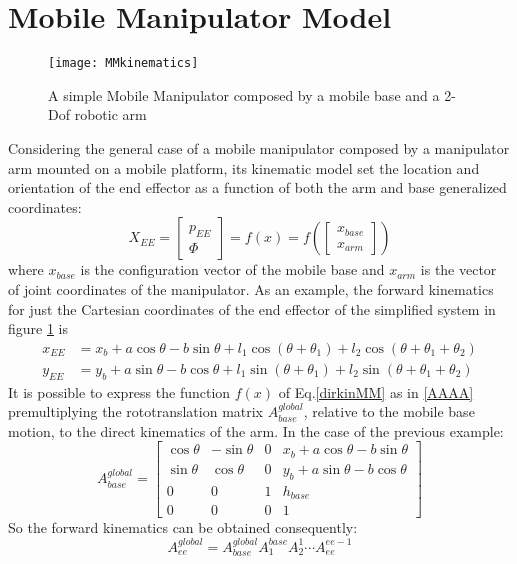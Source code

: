 \section{Mobile Manipulator Model}
\begin{figure}
\centering
\texttt{[image: MMkinematics]}
\caption{A simple Mobile Manipulator composed by a mobile base and a 2-Dof robotic arm}
\label{fig:MMkinematics}
\end{figure}
Considering the general case of a mobile manipulator composed by a manipulator arm mounted on a mobile platform, its kinematic model set the location and orientation of the end effector as a function of both the arm and base generalized coordinates:
\begin{equation}\label{dirkinMM}
	X_{EE}=\left[\begin{matrix}p_{EE}\\\Phi\end{matrix}\right]=f(x)=f\left(\left[\begin{matrix}x_{base}\\x_{arm} \end{matrix}\right]\right)
\end{equation}
where $x_{base}$ is the configuration vector of the mobile base and $x_{arm}$ is the vector of joint coordinates of the manipulator.
As an example, the forward kinematics for just the Cartesian coordinates of the end effector of the simplified system in figure \ref{fig:MMkinematics} is
\begin{equation*}
\begin{split}
	x_{EE}&=x_b+a\cos\theta-b\sin\theta+l_1\cos\left(\theta+\theta_1\right)+l_2\cos\left(\theta+\theta_1+\theta_2\right)\\
	y_{EE}&=y_b+a\sin\theta-b\cos\theta+l_1\sin\left(\theta+\theta_1\right)+l_2\sin\left(\theta+\theta_1+\theta_2\right)
\end{split}
\end{equation*}
It is possible to express the function $f(x)$ of Eq.\ref{dirkinMM} as in \ref{AAAA} premultiplying the rototranslation matrix $A_{base}^{global}$, relative to the mobile base motion, to the direct kinematics of the arm. In the case of the previous example:
\begin{equation}
	A_{base}^{global}=\left[\begin{matrix}
		\cos\theta&-\sin\theta&0&x_b+a\cos\theta-b\sin\theta\\
		\sin\theta&\cos\theta&0&y_b+a\sin\theta-b\cos\theta\\
		0&0&1&h_{base}\\
		0&0&0&1
	\end{matrix}\right]
\end{equation}
So the forward kinematics can be obtained consequently:
\begin{equation}\label{AAAA}
A_{ee}^{global}=A_{base}^{global}A_1^{base}A_2^1\cdots A_{ee}^{ee-1}
\end{equation}
